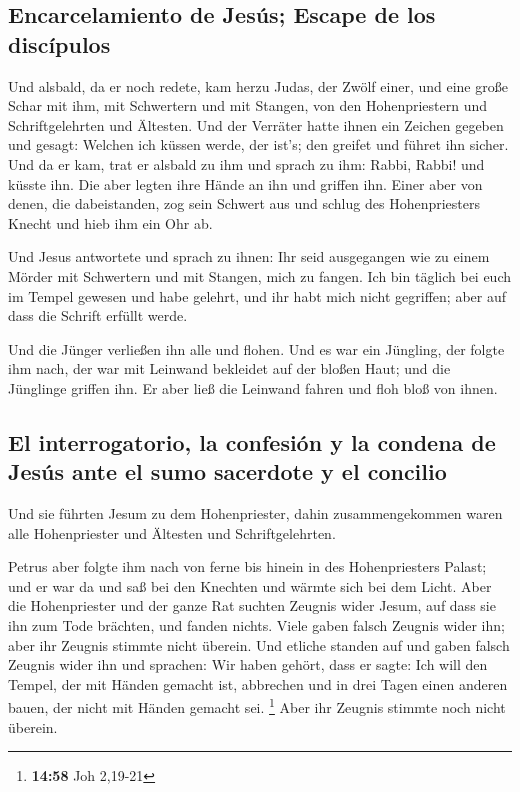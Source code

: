 \hypertarget{encarcelamiento-de-jesuxfas-escape-de-los-discuxedpulos}{%
\subsection{Encarcelamiento de Jesús; Escape de los
discípulos}\label{encarcelamiento-de-jesuxfas-escape-de-los-discuxedpulos}}

 Und alsbald, da er noch redete, kam herzu Judas, der
Zwölf einer, und eine große Schar mit ihm, mit Schwertern und mit
Stangen, von den Hohenpriestern und Schriftgelehrten und Ältesten.
 Und der Verräter hatte ihnen ein Zeichen gegeben und
gesagt: Welchen ich küssen werde, der ist's; den greifet und führet ihn
sicher.  Und da er kam, trat er alsbald zu ihm und sprach
zu ihm: Rabbi, Rabbi! und küsste ihn.  Die aber legten
ihre Hände an ihn und griffen ihn.  Einer aber von denen,
die dabeistanden, zog sein Schwert aus und schlug des Hohenpriesters
Knecht und hieb ihm ein Ohr ab.

 Und Jesus antwortete und sprach zu ihnen: Ihr seid
ausgegangen wie zu einem Mörder mit Schwertern und mit Stangen, mich zu
fangen.  Ich bin täglich bei euch im Tempel gewesen und
habe gelehrt, und ihr habt mich nicht gegriffen; aber auf dass die
Schrift erfüllt werde.

 Und die Jünger verließen ihn alle und flohen.
 Und es war ein Jüngling, der folgte ihm nach, der war
mit Leinwand bekleidet auf der bloßen Haut; und die Jünglinge griffen
ihn.  Er aber ließ die Leinwand fahren und floh bloß von
ihnen.

\hypertarget{el-interrogatorio-la-confesiuxf3n-y-la-condena-de-jesuxfas-ante-el-sumo-sacerdote-y-el-concilio}{%
\subsection{El interrogatorio, la confesión y la condena de Jesús ante
el sumo sacerdote y el
concilio}\label{el-interrogatorio-la-confesiuxf3n-y-la-condena-de-jesuxfas-ante-el-sumo-sacerdote-y-el-concilio}}

 Und sie führten Jesum zu dem Hohenpriester, dahin
zusammengekommen waren alle Hohenpriester und Ältesten und
Schriftgelehrten.

 Petrus aber folgte ihm nach von ferne bis hinein in des
Hohenpriesters Palast; und er war da und saß bei den Knechten und wärmte
sich bei dem Licht.  Aber die Hohenpriester und der ganze
Rat suchten Zeugnis wider Jesum, auf dass sie ihn zum Tode brächten, und
fanden nichts.  Viele gaben falsch Zeugnis wider ihn;
aber ihr Zeugnis stimmte nicht überein.  Und etliche
standen auf und gaben falsch Zeugnis wider ihn und sprachen:
 Wir haben gehört, dass er sagte: Ich will den Tempel,
der mit Händen gemacht ist, abbrechen und in drei Tagen einen anderen
bauen, der nicht mit Händen gemacht sei. \footnote{\textbf{14:58} Joh
  2,19-21}  Aber ihr Zeugnis stimmte noch nicht überein.

